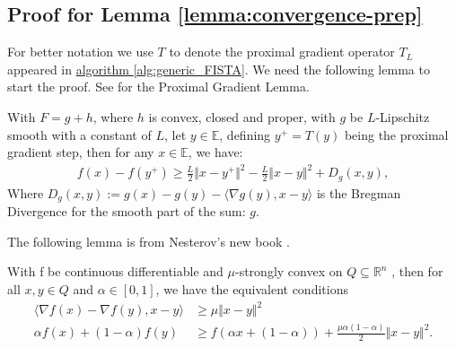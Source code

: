 \subsection{Proof for Lemma \ref*{lemma:convergence-prep}}
    For better notation we use $T$ to denote the proximal gradient operator $T_L$ appeared in \hyperref[alg:generic_FISTA]{algorithm \ref*{alg:generic_FISTA}}. 
    We need the following lemma to start the proof. 
    See \cite[remark 10.17]{beck_first-order_nodate} for the Proximal Gradient Lemma. 
    \begin{lemma}
        With $F = g + h$, where $h$ is convex, closed and proper, with $g$ be $L$-Lipschitz smooth with a constant of $L$, let $y\in \mathbb E$, defining $y^+ = T(y)$ being the proximal gradient step, then for any $x\in \mathbb E$, we have: 
        $$
        \begin{aligned}
        f(x) - f(y^+) \ge \frac{L}{2}\Vert x - y^+\Vert^2 - \frac{L}{2}\Vert x - y\Vert^2 + D_g(x, y),
        \end{aligned}
        $$
        Where $D_g(x, y):= g(x) - g(y) - \langle \nabla g(y), x -y\rangle$ is the Bregman Divergence for the smooth part of the sum: $g$. 
    \end{lemma}
    The following lemma is from Nesterov's new book \cite[thm 2.1.9, (2.1.23)]{nesterov_lectures_2018}. 
    \begin{lemma}
        With f be continuous differentiable and $\mu$-strongly convex on $Q\subseteq \mathbb R^n$ , then for all $x, y \in Q$ and $\alpha\in [0, 1]$, we have the equivalent conditions 
        \begin{align}
            \langle \nabla f(x) - \nabla f(y), x - y\rangle &\ge \mu
            \Vert x - y\Vert^2
            \\
            \alpha f(x) + (1 - \alpha) f(y) &\ge
            f(\alpha x + (1 - \alpha)) + 
            \frac{\mu \alpha(1 - \alpha)}{2}
            \Vert x - y\Vert^2. 
        \end{align}


    \end{lemma}
